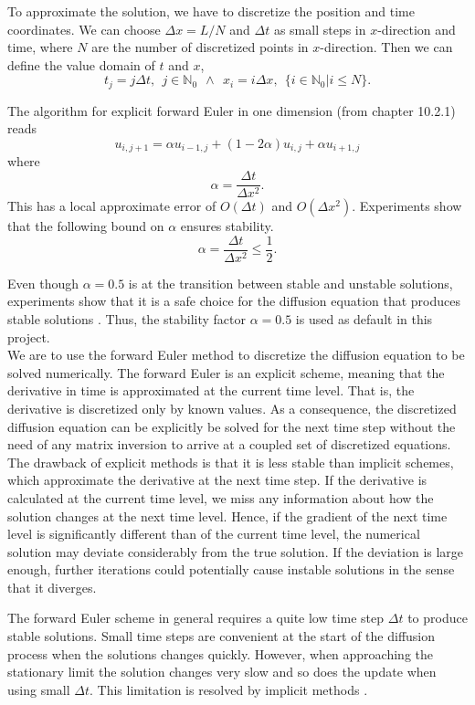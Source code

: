 \documentclass[12pt]{extarticle}
\begin{document}
To approximate the solution, we have to discretize the position and time coordinates. We can choose  $\Delta x = L/N$ and $\Delta t$ as small steps in $x$-direction and time, where $N$ are the number of discretized points in $x$-direction. Then we can define the value domain of $t$ and $x$,
\begin{equation*}
t_j = j\Delta t, \ \ j\in \mathbb{N}_0 \ \ \wedge \ \ x_i = i\Delta x, \ \ \{i \in \mathbb{N}_0 | i \leq N\}.
\end{equation*}

The algorithm for explicit forward Euler in one dimension (from \cite{lectures2015} chapter 10.2.1) reads
\begin{equation}
\label{eq:forward_euler}
u_{i, j+1} = \alpha u_{i-1, j} + (1 - 2\alpha) u_{i,j} + \alpha u_{i+1, j}
\end{equation}
where
\begin{equation*}
\alpha = \frac{\Delta t}{\Delta x^2}.
\end{equation*}
This has a local approximate error of $O(\Delta t)$ and $O(\Delta x ^2)$. Experiments show that the following bound on $\alpha$ ensures stability.
\begin{equation}
	\label{eq:stability}
	\alpha = \frac{\Delta t}{\Delta x^2} \le \frac{1}{2}.
\end{equation} 

Even though $\alpha = 0.5$ is at the transition between stable and unstable solutions, experiments show that it is a safe choice for the diffusion equation that produces stable solutions \cite{Linge2017}. Thus, the stability factor $\alpha=0.5$ is used as default in this project. \\ 

We are to use the forward Euler method to discretize the diffusion equation to be solved numerically. The forward Euler is an explicit scheme, meaning that the derivative in time is approximated at the current time level.
That is, the derivative is discretized only by known values. As a consequence, the discretized diffusion equation can be explicitly be solved for the next time step without the need of any matrix inversion to arrive at a coupled
set of discretized equations. The drawback of explicit methods is that it is less stable than implicit schemes, which approximate the derivative at the next time step.
If the derivative is calculated at the current time level, we miss any information about how the solution changes at the next time level. 
Hence, if the gradient of the next time level is significantly different than of the current time level, the numerical solution may deviate considerably from the true solution. 
If the deviation is large enough, further iterations could potentially cause instable solutions in the sense that it diverges.
\par The forward Euler scheme in general requires a quite low time step $\Delta t$ to produce stable solutions. Small time steps are convenient at the start of the diffusion process when the solutions changes quickly. However, when approaching the stationary limit the solution changes very slow and so does the update when using small $\Delta t$. This limitation is resolved by implicit methods \cite{Linge2017}.
\end{document}

